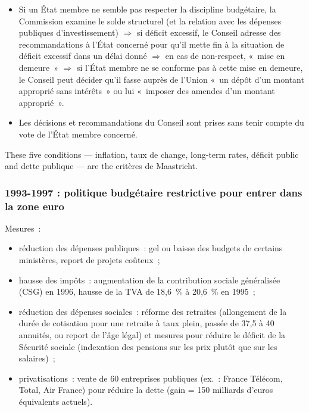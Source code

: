 \begin{itemize}
\begin{itemize}
        et temporaire~;
      \item le rapport entre la dette publique et le PIB est inférieur à 60~\%, à moins
        qu'il ne diminue suffisamment et ne s'en rapproche à un rythme satisfaisant.
    \end{itemize}
  \item Si un État membre ne semble pas respecter la discipline budgétaire, la
    Commission examine le solde structurel (et la relation avec les dépenses publiques
    d'investissement) $\Rightarrow$ si déficit excessif, le Conseil adresse des
    recommandations à l'État concerné pour qu'il mette fin à la situation de déficit
    excessif dans un délai donné $\Rightarrow$ en cas de non-respect, «~mise en
    demeure~» $\Rightarrow$ si l'État membre ne se conforme pas à cette mise en demeure,
    le Conseil peut décider qu'il fasse auprès de l'Union «~un dépôt d'un montant
    approprié sans intérêts~» ou lui «~imposer des amendes d'un montant approprié~».
  \item Les décisions et recommandations du Conseil sont prises sans tenir compte du
    vote de l'État membre concerné.
\end{itemize}
These five conditions --- inflation, taux de change, long-term rates, déficit public and
dette publique --- are the critères de Maastricht.

\subsubsection{1993-1997 : politique budgétaire restrictive pour entrer dans la zone euro}

Mesures~:
\begin{itemize}
  \item réduction des dépenses publiques~: gel ou baisse des budgets de certains
    ministères, report de projets coûteux~;
  \item hausse des impôts~: augmentation de la contribution sociale généralisée (CSG)
    en 1996, hausse de la TVA de 18,6~\% à 20,6~\% en 1995~;
  \item réduction des dépenses sociales~: réforme des retraites (allongement de la durée
    de cotisation pour une retraite à taux plein, passée de 37,5 à 40 annuités, ou
    report de l'âge légal) et mesures pour réduire le déficit de la Sécurité sociale
    (indexation des pensions sur les prix plutôt que sur les salaires)~;
  \item privatisations~: vente de 60 entreprises publiques (ex.~: France Télécom, Total,
    Air France) pour réduire la dette (gain = 150 milliards d'euros équivalents
    actuels).
\end{itemize}

